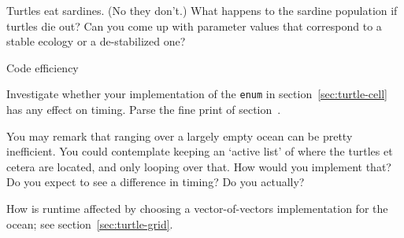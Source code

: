 Turtles eat sardines. (No they don't.)
What happens to the sardine population if turtles die out?
Can you come up with parameter values that correspond to
a stable ecology or a de-stabilized one?

 {Code efficiency}

Investigate whether your implementation of the \lstinline{enum}
in section~\ref{sec:turtle-cell} has any effect on timing.
Parse the fine print of section~.


You may remark that ranging over a largely empty ocean
can be pretty inefficient.
You could contemplate keeping an `active list' of where the
turtles et cetera are located, and only looping over that.
How would you implement that?
Do you expect to see a difference in timing? Do you actually?

How is runtime affected by choosing a
vector-of-vectors implementation for the ocean;
see section~\ref{sec:turtle-grid}.
